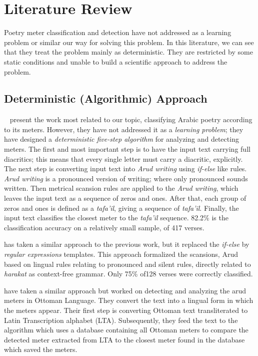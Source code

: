 \chapter{Literature Review}\label{Ch:Literature}
Poetry meter classification and detection have not addressed as a learning problem or similar our way for solving this problem. In this literature, we can see that they treat the problem mainly as deterministic. They are restricted by some static conditions and unable to build a scientific approach to address the problem.%

\section{Deterministic (Algorithmic) Approach}\label{sec:Determ_Algor_Appr}

~\cite{Abuata2016RuleBasedAlgorithm} present the work most related to our topic, classifying Arabic poetry according to its meters. However, they have not addressed it as a \textit{learning problem}; they have designed a \textit{deterministic five-step algorithm} for analyzing and detecting meters. The first and most important step is to have the input text carrying full diacritics; this means that every single letter must carry a diacritic, explicitly. The next step is converting input text into \textit{Arud writing} using \textit{if-else} like rules. \textit{Arud writing} is a pronounced version of writing; where only pronounced sounds written. Then metrical scansion rules are applied to the \textit{Arud writing}, which leaves the input text as a sequence of zeros and ones. After that, each group of zeros and ones is defined as a \textit{tafa'il}, giving a sequence of \textit{tafa'il}. Finally, the input text classifies the closest meter to the \textit{tafa'il} sequence. 82.2\% is the classification accuracy on a relatively small sample, of 417 verses.

\cite{Alnagdawi2013FindingArabicPoemMeter} has taken a similar approach to the previous work, but it replaced the \textit{if-else} by \textit{regular expressions} templates. This approach formalized the scansions, Arud based on lingual rules relating to pronounced and silent rules, directly related to \textit{harakat} as context-free grammar. Only 75\% of128 verses were correctly classified. 

\cite{Kurt2012AlgorithmForDetectionAnalysis} have taken a similar approach but worked on detecting and analyzing the arud meters in Ottoman Language. They convert the text into a lingual form in which the meters appear. Their first step is converting Ottoman text transliterated to Latin Transcription alphabet (LTA). Subsequently, they feed the text to the algorithm which uses a database containing all Ottoman meters to compare the detected meter extracted from LTA to the closest meter found in the database which saved the meters.

